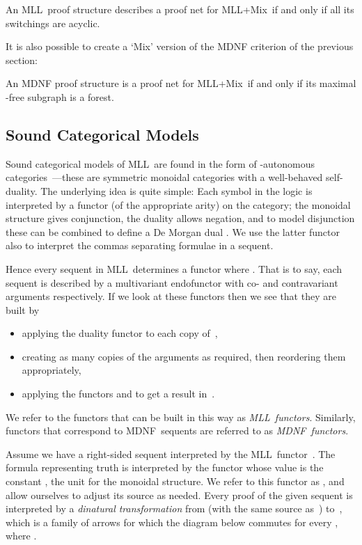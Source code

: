 \documentclass{LMCS}
\theoremstyle{plain}\newtheorem*{cLm}{Claim}
\newcommand{\mll}{MLL} \newcommand{\mall}{MALL}
\newcommand{\mllmix}{MLL+Mix} \newcommand{\GRel}{\mathbf{GRel}}
\newcommand{\p}{} \newcommand{\N}{\mathbb{N}}
\newcommand{\hugh}[1]{#1}
\begin{document}
\begin{fact} \hugh{\cite{FR94}}
An \mll~proof structure describes a proof net for \mllmix\ if and only if all its switchings are acyclic.
\end{fact}

\p It is also possible to create a `Mix' version of the MDNF criterion of the previous section:
\begin{fact} \hugh{\cite{FR94,Ste13}}
An MDNF proof structure is a proof net for \mllmix\ if and only if its maximal
  -free subgraph is a forest.
\end{fact}

\subsection{Sound Categorical Models} \label{CatModels}

Sound categorical models of \mll\ are found in the form of
-autonomous categories~\cite{Bar79,See89}---these are symmetric monoidal
categories with a well-behaved self-duality. The underlying idea is
quite simple: Each symbol in the logic is interpreted by a functor
(of the appropriate arity) on the category; the monoidal structure
 gives conjunction, the duality  allows negation,
and to model disjunction these can be combined to define a De Morgan
dual . We use the
latter functor also to interpret the commas separating formulae in a
sequent.

\p Hence every sequent in \mll\ determines a functor
 where . \hugh{That is to say, each sequent is described by a multivariant endofunctor with  co- and contravariant arguments respectively.} If
we look at these functors then we see that they are built by
\begin{itemize} \item applying the duality functor  to each
  copy of~,
\item creating as many copies of the arguments as
  required, then reordering them appropriately,
\item applying the functors  and  to
  get a result in~.
\end{itemize}
We refer to the functors that can be built in this way as {\em \mll~functors}. Similarly, functors that correspond to MDNF~sequents are
referred to as {\em MDNF~functors}.
  
\p Assume we have a right-sided sequent interpreted by the \mll\
functor~. The formula representing truth is interpreted by the functor whose
value is the constant , the unit for the monoidal structure. We
refer to this functor as , and allow ourselves to adjust its
source as needed. Every proof of the given sequent is interpreted by
a {\em dinatural transformation} from  (with the same source
as~) to~, which is a family of arrows  for which
the diagram below commutes for every , where
.
\end{document}

